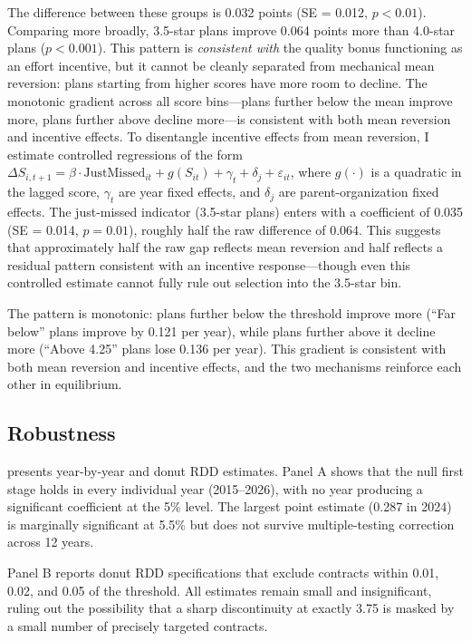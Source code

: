 \documentclass[12pt]{article}
\begin{document}
The difference between these groups is 0.032 points (SE = 0.012, $p < 0.01$). Comparing more broadly, 3.5-star plans improve 0.064 points more than 4.0-star plans ($p < 0.001$). This pattern is \emph{consistent with} the quality bonus functioning as an effort incentive, but it cannot be cleanly separated from mechanical mean reversion: plans starting from higher scores have more room to decline. The monotonic gradient across all score bins---plans further below the mean improve more, plans further above decline more---is consistent with both mean reversion and incentive effects. To disentangle incentive effects from mean reversion, I estimate controlled regressions of the form $\Delta S_{i,t+1} = \beta \cdot \text{JustMissed}_{it} + g(S_{it}) + \gamma_t + \delta_j + \varepsilon_{it}$, where $g(\cdot)$ is a quadratic in the lagged score, $\gamma_t$ are year fixed effects, and $\delta_j$ are parent-organization fixed effects. The just-missed indicator (3.5-star plans) enters with a coefficient of 0.035 (SE = 0.014, $p = 0.01$), roughly half the raw difference of 0.064. This suggests that approximately half the raw gap reflects mean reversion and half reflects a residual pattern consistent with an incentive response---though even this controlled estimate cannot fully rule out selection into the 3.5-star bin.



The pattern is monotonic: plans further below the threshold improve more (``Far below'' plans improve by 0.121 per year), while plans further above it decline more (``Above 4.25'' plans lose 0.136 per year). This gradient is consistent with both mean reversion and incentive effects, and the two mechanisms reinforce each other in equilibrium.

\subsection{Robustness}

 presents year-by-year and donut RDD estimates. Panel A shows that the null first stage holds in every individual year (2015--2026), with no year producing a significant coefficient at the 5\% level. The largest point estimate (0.287 in 2024) is marginally significant at 5.5\% but does not survive multiple-testing correction across 12 years.

Panel B reports donut RDD specifications that exclude contracts within 0.01, 0.02, and 0.05 of the threshold. All estimates remain small and insignificant, ruling out the possibility that a sharp discontinuity at exactly 3.75 is masked by a small number of precisely targeted contracts.
\end{document}

